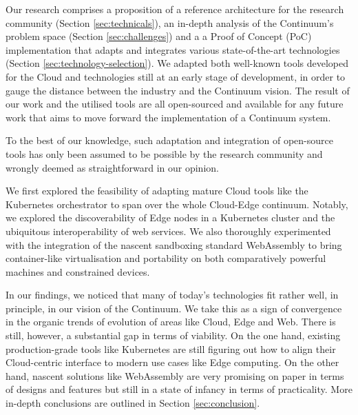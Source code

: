 Our research comprises a proposition of a reference architecture for the research community (Section \ref{sec:technicals}), an in-depth analysis of the Continuum's problem space (Section \ref{sec:challenges}) and a a Proof of Concept (PoC) implementation that adapts and integrates various state-of-the-art technologies (Section \ref{sec:technology-selection}). We adapted both well-known tools developed for the Cloud and technologies still at an early stage of development, in order to gauge the distance between the industry and the Continuum vision. The result of our work and the utilised tools are all open-sourced and available for any future work that aims to move forward the implementation of a Continuum system.

To the best of our knowledge, such adaptation and integration of open-source tools has only been assumed to be possible by the research community \cite{wasm-continuum} and wrongly deemed as straightforward in our opinion.

We first explored the feasibility of adapting mature Cloud tools like the Kubernetes \cite{kubernetes} orchestrator to span over the whole Cloud-Edge continuum. Notably, we explored the discoverability of Edge nodes in a Kubernetes cluster and the ubiquitous interoperability of web services. We also thoroughly experimented with the integration of the nascent sandboxing standard WebAssembly \cite{haas2017bringing} to bring container-like virtualisation and portability on both comparatively powerful machines and constrained devices. 

In our findings, we noticed that many of today's technologies fit rather well, in principle, in our vision of the Continuum. We take this as a sign of convergence in the organic trends of evolution of areas like Cloud, Edge and Web. There is still, however, a substantial gap in terms of viability. On the one hand, existing production-grade tools like Kubernetes \cite{kubernetes} are still figuring out how to align their Cloud-centric interface to modern use cases like Edge computing. On the other hand, nascent solutions like WebAssembly \cite{haas2017bringing} are very promising on paper in terms of designs and features but still in a state of infancy in terms of practicality. More in-depth conclusions are outlined in Section \ref{sec:conclusion}.


